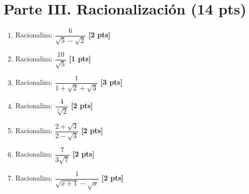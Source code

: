 \documentclass[12pt,a4paper]{article}
\newcommand{\pts}[1]{\hfill\textbf{[#1 pts]}}
\begin{document}
\section*{Parte III. Racionalización \hfill (14 pts)}
\begin{enumerate}[leftmargin=2em, itemsep=1.1em]
  \item Racionaliza: $\dfrac{6}{\sqrt{5}-\sqrt{2}}$ \pts{2}
  \item Racionaliza: $\dfrac{10}{\sqrt{5}}$ \pts{1}
  \item Racionaliza: $\dfrac{1}{1+\sqrt{2}+\sqrt{3}}$ \pts{3}
  \item Racionaliza: $\dfrac{4}{\sqrt[3]{2}}$ \pts{2}
  \item Racionaliza: $\dfrac{2+\sqrt{3}}{2-\sqrt{3}}$ \pts{2}
  \item Racionaliza: $\dfrac{7}{3\sqrt{7}}$ \pts{2}
  \item Racionaliza: $\dfrac{1}{\sqrt{x+1}-\sqrt{x}}$ \pts{2}
\end{enumerate}
\end{document}
